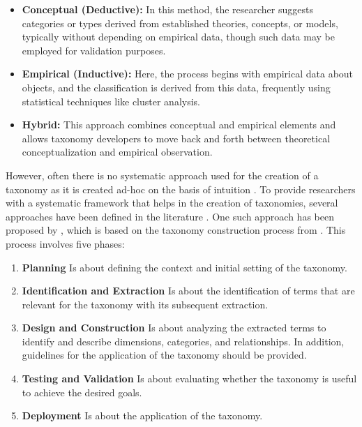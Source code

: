 \begin{itemize}
    \item \textbf{Conceptual (Deductive):} In this method, the researcher suggests categories or types derived from established theories, concepts, or models, typically without depending on empirical data, though such data may be employed for validation purposes. 
    \item \textbf{Empirical (Inductive):} Here, the process begins with empirical data about objects, and the classification is derived from this data, frequently using statistical techniques like cluster analysis.
    \item \textbf{Hybrid:} This approach combines conceptual and empirical elements and allows taxonomy developers to move back and forth between theoretical conceptualization and empirical observation.
\end{itemize}

However, often there is no systematic approach used for the creation of a taxonomy as it is created ad-hoc on the basis of intuition \cite{nickerson_method_2013,usman_taxonomies_2017,kundisch_update_2022}. To provide researchers with a systematic framework that helps in the creation of taxonomies, several approaches have been defined in the literature \cite{nickerson_method_2013,usman_taxonomies_2017,kundisch_update_2022,bayona-ore_critical_2014}. One such approach has been proposed by \textcite{usman_taxonomies_2017}, which is based on the taxonomy construction process from \textcite{bayona-ore_critical_2014}. This process involves five phases:

\begin{enumerate}
    \item \textbf{Planning} Is about defining the context and initial setting of the taxonomy.
    
    \item \textbf{Identification and Extraction} Is about the identification of terms that are relevant for the taxonomy with its subsequent extraction.

    \item \textbf{Design and Construction} Is about analyzing the extracted terms to identify and describe dimensions, categories, and relationships. In addition, guidelines for the application of the taxonomy should be provided.

    \item \textbf{Testing and Validation} Is about evaluating whether the taxonomy is useful to achieve the desired goals.

    \item \textbf{Deployment} Is about the application of the taxonomy.
\end{enumerate}

